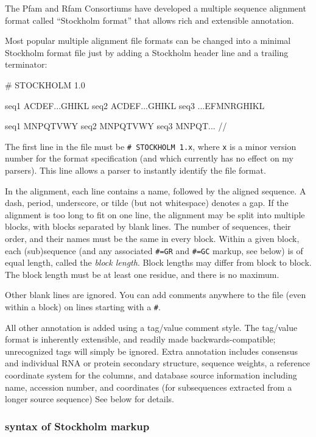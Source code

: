 The Pfam and Rfam Consortiums have developed a multiple sequence
alignment format called ``Stockholm format'' that allows rich and
extensible annotation. 

Most popular multiple alignment file formats can be changed into a
minimal Stockholm format file just by adding a Stockholm header line
and a trailing \prog{//} terminator:

\begin{sreoutput}
# STOCKHOLM 1.0

seq1  ACDEF...GHIKL
seq2  ACDEF...GHIKL
seq3  ...EFMNRGHIKL

seq1  MNPQTVWY
seq2  MNPQTVWY
seq3  MNPQT...
//
\end{sreoutput}

The first line in the file must be \verb+# STOCKHOLM 1.x+, where
\verb+x+ is a minor version number for the format specification
(and which currently has no effect on my parsers). This line allows a
parser to instantly identify the file format.

In the alignment, each line contains a name, followed by the aligned
sequence. A dash, period, underscore, or tilde (but not whitespace)
denotes a gap. If the alignment is too long to fit on one line, the
alignment may be split into multiple blocks, with blocks separated by
blank lines. The number of sequences, their order, and their names
must be the same in every block. Within a given block, each
(sub)sequence (and any associated \verb+#=GR+ and \verb+#=GC+ markup,
see below) is of equal length, called the \textit{block length}. Block
lengths may differ from block to block. The block length must be at
least one residue, and there is no maximum.

Other blank lines are ignored. You can add comments anywhere to the
file (even within a block) on lines starting with a \verb+#+.

All other annotation is added using a tag/value comment style. The
tag/value format is inherently extensible, and readily made
backwards-compatible; unrecognized tags will simply be ignored. Extra
annotation includes consensus and individual RNA or protein secondary
structure, sequence weights, a reference coordinate system for the
columns, and database source information including name, accession
number, and coordinates (for subsequences extracted from a longer
source sequence) See below for details.

\subsubsection{syntax of Stockholm markup}

